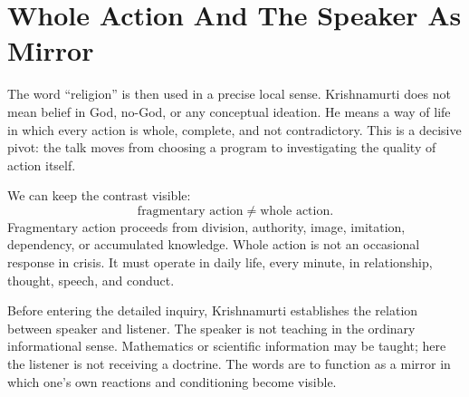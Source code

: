 \begin{figure}
\centering
{}
\end{figure}

\section{Whole Action And The Speaker As Mirror}

The word ``religion'' is then used in a precise local sense. Krishnamurti does not mean belief in God, no-God, or any conceptual ideation. He means a way of life in which every action is whole, complete, and not contradictory. This is a decisive pivot: the talk moves from choosing a program to investigating the quality of action itself.

We can keep the contrast visible:
\begin{equation}
\text{fragmentary action}
\neq
\text{whole action}.
\end{equation}
Fragmentary action proceeds from division, authority, image, imitation, dependency, or accumulated knowledge. Whole action is not an occasional response in crisis. It must operate in daily life, every minute, in relationship, thought, speech, and conduct.

Before entering the detailed inquiry, Krishnamurti establishes the relation between speaker and listener. The speaker is not teaching in the ordinary informational sense. Mathematics or scientific information may be taught; here the listener is not receiving a doctrine. The words are to function as a mirror in which one's own reactions and conditioning become visible.


